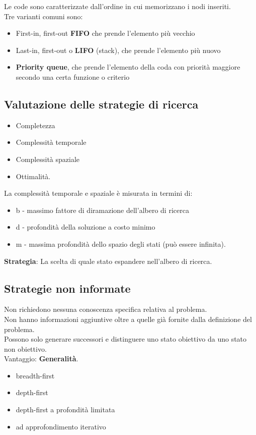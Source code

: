\documentclass[../main.tex]{subfiles}
\begin{document}
	Le code sono caratterizzate dall’ordine in cui memorizzano i nodi inseriti.\\
	Tre varianti comuni sono: 
	\begin{itemize}
		\item First-in, first-out \textbf{FIFO} che prende l’elemento più vecchio
		\item Last-in, first-out o \textbf{LIFO} (stack), che prende l’elemento più nuovo
		\item \textbf{Priority queue}, che prende l’elemento della coda con priorità maggiore secondo una certa funzione o criterio
	\end{itemize}
	\subsection{Valutazione delle strategie di ricerca} 
	\begin{itemize}
		\item Completezza
		\item Complessità temporale
		\item Complessità spaziale
		\item Ottimalità.
	\end{itemize}
	La complessità temporale e spaziale è misurata in termini di:
	\begin{itemize}
		\item b - massimo fattore di diramazione dell’albero di ricerca
		\item d - profondità della soluzione a costo minimo
		\item m - massima profondità dello spazio degli stati (può essere infinita).
	\end{itemize}
	\textbf{Strategia}: La scelta di quale stato espandere nell’albero di ricerca.
	\subsection{Strategie non informate}
	Non richiedono nessuna conoscenza specifica relativa al problema. \\
	Non hanno informazioni aggiuntive oltre a quelle già fornite dalla definizione del problema. \\
	Possono solo generare successori e distinguere uno stato obiettivo da uno stato non obiettivo. \\
	Vantaggio: \textbf{Generalità}.
	\begin{itemize}
		\item breadth-first
		\item depth-first
		\item depth-first a profondità limitata
		\item ad approfondimento iterativo
	\end{itemize}
\end{document}

